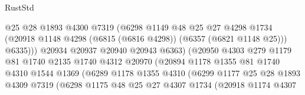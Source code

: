\begin{lexlean}{RustStd}
\begin{coremodule}
                                    @25
                                    @28
                                    @1893
                                    @4300
                                    @7319
                                    (@6298
                                      @1149
                                      @48
                                      @25
                                      @27
                                      @4298
                                      @1734
                                      (@20918
                                        @1148
                                        @4298
                                        (@6815 (@6816 @4298))
                                        (@6357 (@6821 @1148 @25)))
                                      @6335)))
                                @20934
                                @20937
                                @20940
                                @20943
                                @6363)
                              (@20950
                                @4303
                                @279
                                @1179
                                @81
                                @1740
                                @2135
                                @1740
                                @4312
                                @20970
                                (@20894
                                  @1178
                                  @1355
                                  @81
                                  @1740
                                  @4310
                                  @1544
                                  @1369
                                  (@6289
                                    @1178
                                    @1355
                                    @4310
                                    (@6299
                                      @1177
                                      @25
                                      @28
                                      @1893
                                      @4309
                                      @7319
                                      (@6298
                                        @1175
                                        @48
                                        @25
                                        @27
                                        @4307
                                        @1734
                                        (@20918
                                          @1174
                                          @4307

\end{coremodule}
\end{lexlean}
